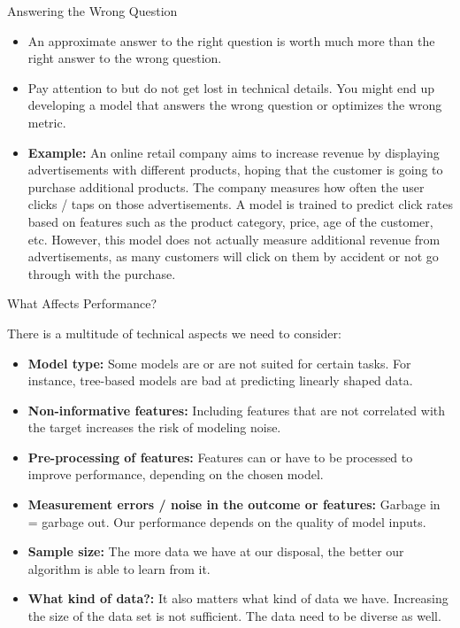 \documentclass[11pt,compress,t,notes=noshow, aspectratio=169, xcolor=table]{beamer}
\begin{document}
\begin{frame}{Answering the Wrong Question}
\begin{itemize}
\setlength\itemsep{1em}
    \item An approximate answer to the right question is worth much more than the right answer to the wrong question.
    \item Pay attention to but do not get lost in technical details. You might end up developing a model that answers the wrong question or optimizes the wrong metric.
    \item \textbf{Example:} An online retail company aims to increase revenue by displaying advertisements with different products, hoping that the customer is going to purchase additional products. The company measures how often the user clicks / taps on those advertisements. A model is trained to predict click rates based on features such as the product category, price, age of the customer, etc. However, this model does not actually measure additional revenue from advertisements, as many customers will click on them by accident or not go through with the purchase.
\end{itemize}
    
\end{frame}
\begin{frame}{What Affects Performance?}

There is a multitude of technical aspects we need to consider:
\vspace{1em}
\begin{itemize}
\setlength\itemsep{1em}
    \item \textbf{Model type:} Some models are or are not suited for certain tasks. For instance, tree-based models are bad at predicting linearly shaped data.
    \item \textbf{Non-informative features:} Including features that are not correlated with the target increases the risk of modeling noise.
    \item \textbf{Pre-processing of features:} Features can or have to be processed to improve performance, depending on the chosen model.
    \item \textbf{Measurement errors / noise in the outcome or features:} Garbage in = garbage out. Our performance depends on the quality of model inputs.
    \item \textbf{Sample size:} The more data we have at our disposal, the better our algorithm is able to learn from it.
    \item \textbf{What kind of data?:} It also matters what kind of data we have. Increasing the size of the data set is not sufficient. The data need to be diverse as well.
\end{itemize}
\end{frame}



\endlecture
\end{document}
